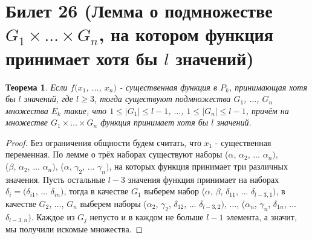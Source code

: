 \documentclass[a4paper, 12pt]{article}
\theoremstyle{definition}
\theoremstyle{plain}
\newtheorem*{theorem}{Теорема}
\theoremstyle{remark}
\begin{document}
  \section{Билет 26 (Лемма о подмножестве $G_1\times\ldots\times G_n$, на котором функция принимает хотя бы $l$ значений)}
  \begin{theorem}
    Если $f(x_1$, $\ldots$, $x_n)$ - существенная функция в $P_k$, принимающая хотя бы $l$ значений, где $l\geqslant3$, тогда существуют подмножества $G_1$, $\ldots$, $G_n$ множества $E_k$ такие, что $1\leqslant|G_1|\leqslant l-1$, $\ldots$, $1\leqslant|G_n|\leqslant l-1$, причём на множестве $G_1\times\ldots\times G_n$ функция принимает хотя бы $l$ значений.
  \end{theorem}
  \begin{proof}
    Без ограничения общности будем считать, что $x_1$ - существенная переменная. По лемме о трёх наборах существуют наборы ($\alpha$, $\alpha_2$, $\ldots$ $\alpha_n)$,\\ ($\beta$, $\alpha_2$, $\ldots$ $\alpha_n)$, ($\alpha$, $\gamma_2$, $\ldots$ $\gamma_n)$, на которых функция принимает три различных значения. Пусть остальные $l-3$ значения функция принимает на наборах\\ $\delta_i=(\delta_{i1}$, $\ldots$ $\delta_{in})$, тогда в качестве $G_1$ выберем набор ($\alpha$, $\beta$, $\delta_{11}$, $\ldots$ $\delta_{l-3,1})$, в качестве $G_2$, $\ldots$, $G_n$ выберем наборы ($\alpha_2$, $\gamma_2$, $\delta_{12}$, $\ldots$ $\delta_{l-3,2})$, $\ldots$, ($\alpha_n$, $\gamma_n$, $\delta_{1n}$, $\ldots$ $\delta_{l-3,n})$. Каждое из $G_j$ непусто и в каждом не больше $l-1$ элемента, а значит, мы получили искомые множества.
  \end{proof}
\end{document}
